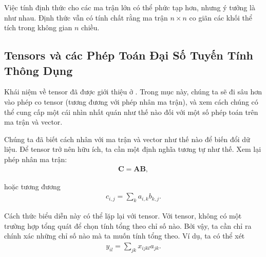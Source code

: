 \documentclass[letterpaper,11pt,english]{sphinxmanual}
\begin{document}
Việc tính định thức cho các ma trận lớn có thể phức tạp hơn, nhưng ý
tưởng là như nhau. Định thức vẫn có tính chất rằng ma trận
\(n\times n\) co giãn các khối thể tích trong không gian \(n\)
chiều.








\subsection{Tensors và các Phép Toán Đại Số Tuyến Tính Thông Dụng}
\label{\detokenize{chapter_appendix_math/geometry-linear-algebric-ops_vn:tensors-va-cac-phep-toan-dai-so-tuyen-tinh-thong-dung}}


Khái niệm về tensor đã được giới thiệu ở .
Trong mục này, chúng ta sẽ đi sâu hơn vào phép co tensor (tương đương
với phép nhân ma trận), và xem cách chúng có thể cung cấp một cái nhìn
nhất quán như thế nào đối với một số phép toán trên ma trận và vector.



Chúng ta đã biết cách nhân với ma trận và vector như thế nào để biến đổi
dữ liệu. Để tensor trở nên hữu ích, ta cần một định nghĩa tương tự như
thế. Xem lại phép nhân ma trận:
\begin{equation}\label{equation:chapter_appendix_math/geometry-linear-algebric-ops_vn:chapter_appendix_math/geometry-linear-algebric-ops_vn:27}
\begin{split}\mathbf{C} = \mathbf{A}\mathbf{B},\end{split}
\end{equation}


hoặc tương đương
\begin{equation}\label{equation:chapter_appendix_math/geometry-linear-algebric-ops_vn:chapter_appendix_math/geometry-linear-algebric-ops_vn:28}
\begin{split}c_{i, j} = \sum_{k} a_{i, k}b_{k, j}.\end{split}
\end{equation}


Cách thức biểu diễn này có thể lặp lại với tensor. Với tensor, không có
một trường hợp tổng quát để chọn tính tổng theo chỉ số nào. Bởi vậy, ta
cần chỉ ra chính xác những chỉ số nào mà ta muốn tính tổng theo. Ví dụ,
ta có thể xét
\begin{equation}\label{equation:chapter_appendix_math/geometry-linear-algebric-ops_vn:chapter_appendix_math/geometry-linear-algebric-ops_vn:29}
\begin{split}y_{il} = \sum_{jk} x_{ijkl}a_{jk}.\end{split}
\end{equation}
\end{document}

